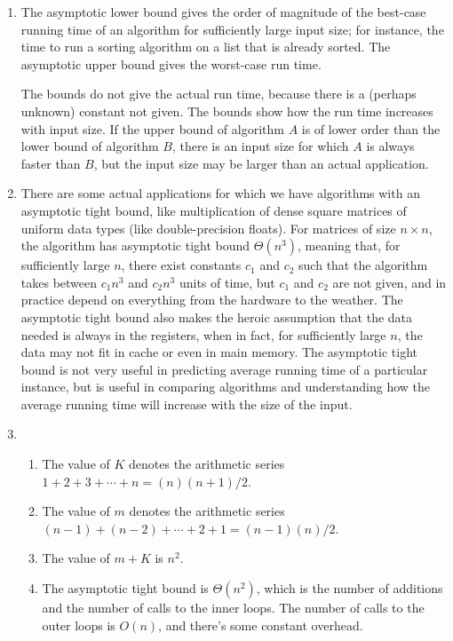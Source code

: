 \begin{enumerate}[label=\alph*.]
	\item The asymptotic lower bound gives the order of magnitude of the best-case running time of an algorithm for sufficiently large input size; for instance, the time to run a sorting algorithm on a list that is already sorted.  The asymptotic upper bound gives the worst-case run time.  
	
	The bounds do not give the actual run time, because there is a (perhaps unknown) constant not given.  The bounds show how the run time increases with input size.  If the upper bound of algorithm $A$ is of lower order than the lower bound of algorithm $B$, there is an input size for which $A$ is always faster than $B$, but the input size may be larger than an actual application.  
	
	\item There are some actual applications for which we have algorithms with an asymptotic tight bound, like multiplication of dense square matrices of uniform data types (like double-precision floats).  For matrices of size $n \times n$, the algorithm has asymptotic tight bound $\Theta(n^3)$, meaning that, for sufficiently large $n$, there exist constants $c_1$ and $c_2$ such that the algorithm takes between $c_1n^3$ and $c_2n^3$ units of time, but $c_1$ and $c_2$ are not given, and in practice depend on everything from the hardware to the weather.  The asymptotic tight bound also makes the heroic assumption that the data needed is always in the registers, when in fact, for sufficiently large $n$, the data may not fit in cache or even in main memory.  The asymptotic tight bound is not very useful in predicting average running time of a particular instance, but is useful in comparing algorithms and understanding how the average running time will increase with the size of the input.  
	
	\item 
	\begin{enumerate}
		\item The value of $K$ denotes the arithmetic series $1 + 2 + 3 + \cdots + n = (n)(n+1)/2$.
		\item The value of $m$ denotes the arithmetic series $(n-1) + (n-2) + \cdots + 2 + 1 = (n-1)(n)/2$.  
		\item The value of $m+K$ is $n^2$.  
		\item The asymptotic tight bound is $\Theta(n^2)$, which is the number of additions and the number of calls to the inner loops.  The number of calls to the outer loops is $O(n)$, and there's some constant overhead. 
	\end{enumerate}
\end{enumerate}


